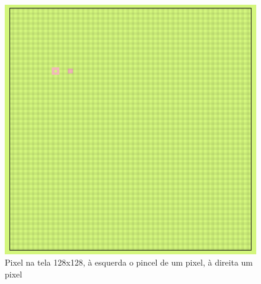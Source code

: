 \begin{figure}[htbp]
    \centering
    \caption{\small Pixel na tela 128x128, à esquerda o pincel de um pixel, à direita um pixel}
    \label{fig:pixieHausPixel}
    \includegraphics[width=1\linewidth]{figs/pixieHaus/tela_editor_pixel.PNG}
\end{figure}